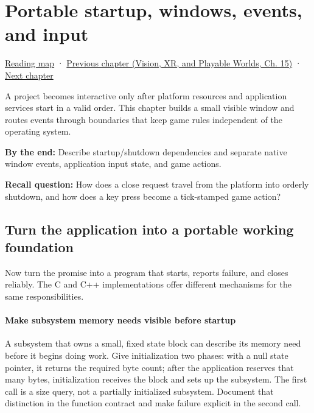 \chapter{Portable startup, windows, events, and input}\label{05-engine-i-ch013-portable-startup-windows-events-and-input}\hypertarget{05-engine-i-ch013}{}\label{stagechapter:05-engine-i-ch013}

\hyperref[volume-reading-map]{Reading map} · \href{../07-Vision-XR-and-Playable-Worlds/main.pdf\#nameddest=05-engine-i-ch012-transactions-recovery-and-safe-project-boundaries}{Previous chapter (Vision, XR, and Playable Worlds, Ch. 15)} · \hyperref[05-engine-i-ch014-application-clocks-and-stable-input-identity]{Next chapter}

A project becomes interactive only after platform resources and application services start in a valid order. This chapter builds a small visible window and routes events through boundaries that keep game rules independent of the operating system.

\textbf{By the end:} Describe startup/shutdown dependencies and separate native window events, application input state, and game actions.

\textbf{Recall question:} How does a close request travel from the platform into orderly shutdown, and how does a key press become a tick-stamped game action?

\section{Turn the application into a portable working foundation}\label{05-engine-i-ch013-turn-the-application-into-a-portable-working-foundation}

Now turn the promise into a program that starts, reports failure, and closes reliably. The C and C++ implementations offer different mechanisms for the same responsibilities.

\subsubsection{Make subsystem memory needs visible before startup}\label{05-engine-i-ch013-make-subsystem-memory-needs-visible-before-startup}

A subsystem that owns a small, fixed state block can describe its memory need before it begins doing work. Give initialization two phases: with a null state pointer, it returns the required byte count; after the application reserves that many bytes, initialization receives the block and sets up the subsystem. The first call is a size query, not a partially initialized subsystem. Document that distinction in the function contract and make failure explicit in the second call.

